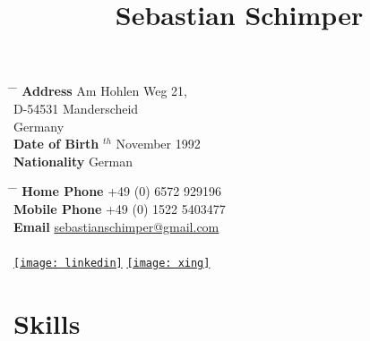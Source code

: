 \documentclass[10pt]{article} %
\begin{document}

\title{Sebastian Schimper} %


\parbox{0.5\textwidth}{ %
	\begin{tabbing} %
		\hspace{3cm} \= \hspace{4cm} \= \kill %
		{\bf Address} \> Am Hohlen Weg 21,\\ %
		\> D-54531 Manderscheid \\ %
		\> Germany \\ %
		{\bf Date of Birth} $^{th}$ November 1992 \\ %
		{\bf Nationality} \> German %
\end{tabbing}}
\hfill %
\parbox{0.5\textwidth}{ %
	\begin{tabbing} %
		\hspace{3cm} \= \hspace{4cm} \= \kill %
		{\bf Home Phone} \> +49 (0) 6572 929196 \\ %
		{\bf Mobile Phone} \> +49 (0) 1522 5403477 \\ %
		{\bf Email} \> \href{mailto:sebastianschimper@gmail.com}{sebastianschimper@gmail.com} \\ %
		\> \\
		\href{https://www.linkedin.com/in/sebastian-schimper-24b871132/}{\texttt{[image: linkedin]}} \hspace{2mm} \href{https://www.xing.com/profile/Sebastian_Schimper/cv}{\texttt{[image: xing]}} 
\end{tabbing}}


\section{Skills}
\end{document}
